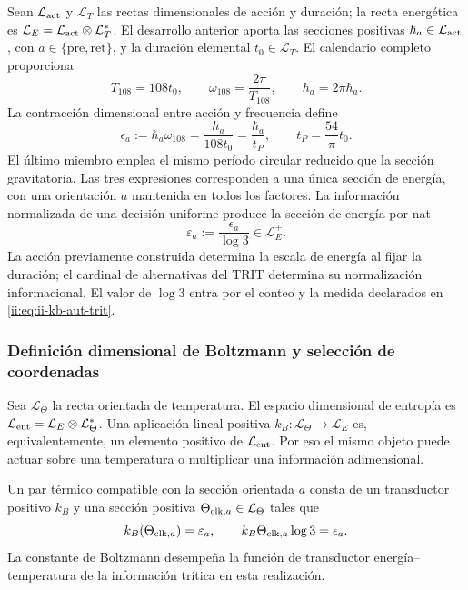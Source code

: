 Sean \(\mathcal L_{\rm act}\) y \(\mathcal L_T\) las rectas
dimensionales de acción y duración; la recta energética es
\(\mathcal L_E=\mathcal L_{\rm act}\otimes\mathcal L_T^*\).
El desarrollo anterior aporta las secciones positivas
\(\hbar_a\in\mathcal L_{\rm act}\), con
\(a\in\{\mathrm{pre},\mathrm{ret}\}\), y la duración elemental
\(t_0\in\mathcal L_T\). El calendario completo proporciona
\[
 T_{108}=108t_0,\qquad
 \omega_{108}=\frac{2\pi}{T_{108}},\qquad
 h_a=2\pi\hbar_a.
\]
La contracción dimensional entre acción y frecuencia define
\begin{equation}
 \epsilon_a:=\hbar_a\omega_{108}
 =\frac{h_a}{108t_0}
 =\frac{\hbar_a}{t_P},\qquad
 t_P=\frac{54}{\pi}t_0.
 \label{ii:eq:ii-kb-aut-energia}
\end{equation}
El último miembro emplea el mismo período circular reducido que la
sección gravitatoria. Las tres expresiones corresponden a una única
sección de energía, con una orientación \(a\) mantenida en todos
los factores. La información normalizada de una decisión uniforme
produce la sección de energía por nat
\begin{equation}
 \varepsilon_a:=\frac{\epsilon_a}{\log3}\in\mathcal L_E^+.
 \label{ii:eq:ii-kb-aut-energia-nat}
\end{equation}
La acción previamente construida determina la escala de energía al
fijar la duración; el cardinal de alternativas del TRIT determina su
normalización informacional. El valor de \(\log3\) entra por el
conteo y la medida declarados en \eqref{ii:eq:ii-kb-aut-trit}.

\subsubsection{Definición dimensional de Boltzmann y selección de coordenadas}

Sea \(\mathcal L_\Theta\) la recta orientada de temperatura.
El espacio dimensional de entropía es
\(\mathcal L_{\rm ent}=\mathcal L_E\otimes\mathcal L_\Theta^*\).
Una aplicación lineal positiva
\(k_B:\mathcal L_\Theta\to\mathcal L_E\) es, equivalentemente,
un elemento positivo de \(\mathcal L_{\rm ent}\). Por eso el mismo
objeto puede actuar sobre una temperatura o multiplicar una información
adimensional.

\begin{definition}
Un par térmico compatible con la sección orientada \(a\) consta de
un transductor positivo \(k_B\) y una sección positiva
\(\Theta_{{\rm clk},a}\in\mathcal L_\Theta\) tales que
\begin{equation}
 k_B(\Theta_{{\rm clk},a})=\varepsilon_a,
 \qquad
 k_B\Theta_{{\rm clk},a}\log3=\epsilon_a.
 \label{ii:eq:ii-kb-aut-par-termico}
\end{equation}
La constante de Boltzmann desempeña la función de transductor
energía--temperatura de la información trítica en esta realización.
\end{definition}


